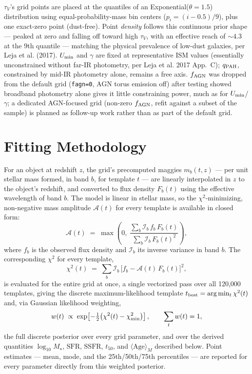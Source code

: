 \documentclass[12pt]{article}
\newcommand{\chisq}{\chi^2}
\newcommand{\amp}{\mathcal{A}}
\newcommand{\iamp}{\mathcal{I}}
\begin{document}
$\tau_V$'s grid points are placed at the quantiles of an
Exponential($\theta=1.5$) distribution using equal-probability-mass bin
centers ($p_i = (i-0.5)/9$), plus one exact-zero point (dust-free). Point
\emph{density} follows this continuous prior shape --- peaked at zero and
falling off toward high $\tau_V$, with an effective reach of $\sim4.3$ at
the 9th quantile --- matching the physical prevalence of low-dust
galaxies, per Leja et al. (2017). $U_{\rm min}$ and $\gamma$ are fixed at
representative ISM values (essentially unconstrained without far-IR
photometry, per Leja et al. 2017 App.~C); $q_{\rm PAH}$, constrained by
mid-IR photometry alone, remains a free axis. $f_{\rm AGN}$ was dropped
from the default grid (\texttt{fagn=0}, AGN torus emission off) after
testing showed broadband photometry alone gives it little constraining
power, much as for $U_{\rm min}$/$\gamma$; a dedicated AGN-focused grid
(non-zero $f_{\rm AGN}$, refit against a subset of the sample) is planned
as follow-up work rather than as part of the default grid.

\section{Fitting Methodology}
\label{sec:fit}

For an object at redshift $z$, the grid's precomputed maggies
$m_b(t, z)$ --- per unit stellar mass formed, in band $b$, for template $t$
--- are linearly interpolated in $z$ to the object's redshift, and converted
to flux density $F_b(t)$ using the effective wavelength of band $b$. The
model is linear in stellar mass, so the $\chisq$-minimizing, non-negative
mass amplitude $\amp(t)$ for every template is available in closed form:
\begin{equation}
  \boxed{
  \amp(t) \;=\; \max\!\left(0,\;
  \frac{\sum_b \iamp_b\, f_b\, F_b(t)}{\sum_b \iamp_b\, F_b(t)^2}
  \right),
  }
  \label{eq:amplitude}
\end{equation}
where $f_b$ is the observed flux density and $\iamp_b$ its inverse variance
in band $b$. The corresponding $\chisq$ for every template,
\begin{equation}
  \chisq(t) \;=\; \sum_b \iamp_b\,\bigl[f_b - \amp(t)\,F_b(t)\bigr]^2,
  \label{eq:chi2}
\end{equation}
is evaluated for the entire grid at once, a single vectorized pass over all
120{,}000 templates, giving the discrete maximum-likelihood template
$t_{\rm best} = \arg\min_t \chisq(t)$ and, via Gaussian likelihood weighting,
\begin{equation}
  w(t) \;\propto\; \exp\!\left[-\tfrac{1}{2}\bigl(\chisq(t) - \chisq_{\rm min}\bigr)\right],
  \qquad \sum_t w(t) = 1,
  \label{eq:weight}
\end{equation}
the full discrete posterior over every grid parameter, and over the
derived quantities $\log_{10} M_\star$, $\mathrm{SFR}$, $\mathrm{SSFR}$,
$t_{50}$, and $\langle\mathrm{Age}\rangle_M$ described below. Point
estimates --- mean, mode, and the 25th/50th/75th percentiles --- are
reported for every parameter directly from this weighted posterior.
\end{document}
